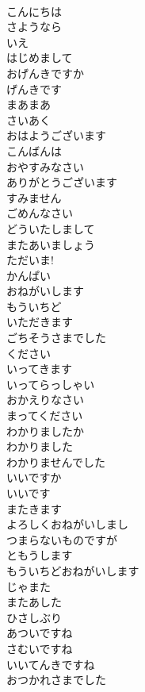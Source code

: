 \documentclass[8pt]{extreport}
\begin{document}
\begin{CJK}{UTF8}{min}
\\	こんにちは	
\\	さようなら	
\\	いえ	
\\	はじめまして	
\\	おげんきですか	
\\	げんきです	
\\	まあまあ	
\\	さいあく	
\\	おはようございます	
\\	こんばんは	
\\	おやすみなさい	
\\	ありがとうございます	
\\	すみません	
\\	ごめんなさい	
\\	どういたしまして	
\\	またあいましょう	
\\	ただいま!	
\\	かんぱい	
\\	おねがいします	
\\	もういちど	
\\	いただきます	
\\	ごちそうさまでした	
\\	ください	
\\	いってきます	
\\	いってらっしゃい	
\\	おかえりなさい	
\\	まってください	
\\	わかりましたか	
\\	わかりました	
\\	わかりませんでした	
\\	いいですか	
\\	いいです	
\\	またきます	
\\	よろしくおねがいしまし	
\\	つまらないものですが	
\\	ともうします	
\\	もういちどおねがいします	
\\	じゃまた	
\\	またあした	
\\	ひさしぶり	
\\	あついですね	
\\	さむいですね	
\\	いいてんきですね	
\\	おつかれさまでした	

\end{CJK}
\end{document}
